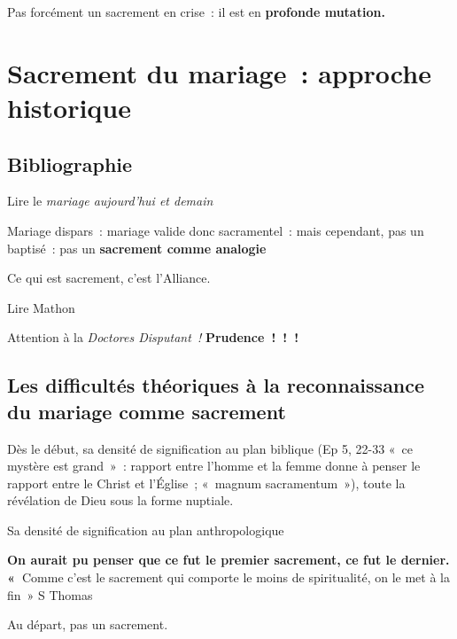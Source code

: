 Pas forcément un sacrement en crise~: il est en \textbf{profonde
mutation.}



\chapter{Sacrement du mariage~: approche historique}



\hypertarget{bibliographie}{%
\section{Bibliographie}\label{bibliographie}}

Lire le \emph{mariage aujourd'hui et demain}

Mariage dispars~: mariage valide donc sacramentel~: mais cependant, pas
un baptisé~: pas un \textbf{sacrement comme analogie}

Ce qui est sacrement, c'est l'Alliance.

Lire Mathon

Attention à la \emph{Doctores Disputant~!} \textbf{Prudence~!~!~!}

\hypertarget{les-difficultuxe9s-thuxe9oriques-uxe0-la-reconnaissance-du-mariage-comme-sacrement}{%
\section{Les difficultés théoriques à la reconnaissance du mariage comme
sacrement}\label{les-difficultuxe9s-thuxe9oriques-uxe0-la-reconnaissance-du-mariage-comme-sacrement}}

Dès le début, sa densité de signification au plan biblique (Ep 5, 22-33
«~ce mystère est grand~»~: rapport entre l'homme et la femme donne à
penser le rapport entre le Christ et l'Église~; «~magnum sacramentum~»),
toute la révélation de Dieu sous la forme nuptiale.

Sa densité de signification au plan anthropologique

\textbf{On aurait pu penser que ce fut le premier sacrement, ce fut le
dernier. «~}Comme c'est le sacrement qui comporte le moins de
spiritualité, on le met à la fin~» S Thomas

Au départ, pas un sacrement.

